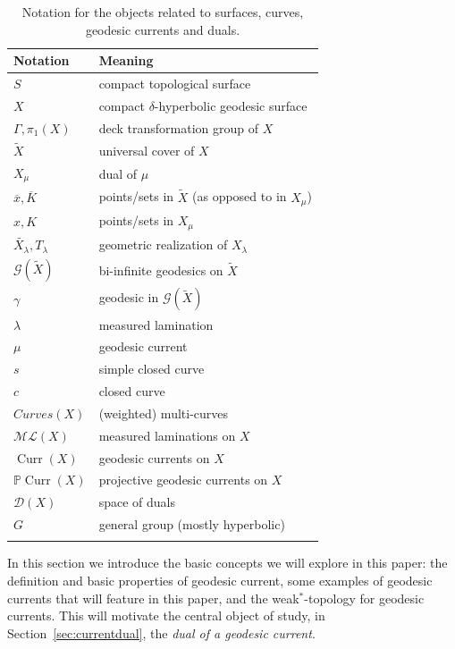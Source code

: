 \documentclass[12pt,article]{amsart}
\numberwithin{equation}{section}
\numberwithin{figure}{section}
\theoremstyle{definition}
\theoremstyle{plain}
\newcommand\G{\ensuremath{\mathcal{G}}}
\DeclareMathOperator{\Curr}{Curr}
\newcommand*{\wt}[1]{\widetilde{#1}}
\newcommand{\Curves}{\mathit{Curves}}
\newcommand{\ML}{\mathcal{ML}}
\begin{document}
\begin{table}
    \begin{tabular}{@{}ll@{}}
      \toprule
      Notation & Meaning \\
      \midrule
         $S$ &  compact topological surface \\
         $X$ &  compact $\delta$-hyperbolic geodesic surface \\
         $\Gamma, \pi_1(X)$ & deck transformation group of $X$ \\       
         $\wt{X}$ &  universal cover of $X$ \\
         $X_{\mu}$ & dual of $\mu$ \\
         $\overline{x}, \overline{K}$ &  points/sets in $\wt{X}$ (as opposed to in $X_{\mu}$) \\ 
         $x, K$ &  points/sets in $X_{\mu}$ \\
         $\wt{X_{\lambda}}, T_{\lambda}$ & geometric realization of $X_{\lambda}$ \\
         $\G(\wt{X})$ & bi-infinite geodesics on $\wt{X}$ \\
         $\gamma$ & geodesic in $\G(\wt{X})$\\
         $\lambda$ & measured lamination\\
         $\mu$ & geodesic current\\
         $s$ & simple closed curve \\
         $c$ & closed curve \\

         $\Curves(X)$ &  (weighted) multi-curves \\
         $\ML(X)$ & measured laminations on $X$ \\
         $\Curr(X)$ & geodesic currents on $X$ \\
         $\mathbb{P}\Curr(X)$ & projective geodesic currents on $X$ \\
         $\mathcal{D}(X)$ & space of duals \\
         $G$ & general group (mostly hyperbolic) \\
      \bottomrule\addlinespace
    \end{tabular}
  \caption{Notation for the objects related to surfaces, curves,
    geodesic currents and duals.}\label{tab:object-notation}
\end{table}

In this section we introduce the basic concepts we will explore in this paper: the definition and basic properties of geodesic current, some examples of geodesic currents that will feature in this paper, and the weak$^*$-topology for geodesic currents.
This will motivate the central object of study, in Section~\ref{sec:currentdual}, the \emph{dual of a geodesic current}.
\end{document}
